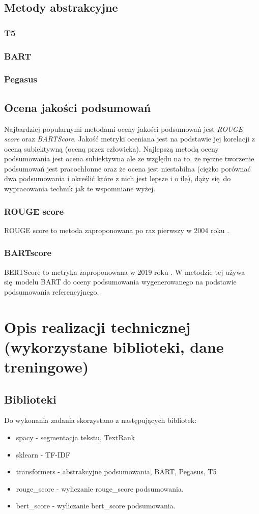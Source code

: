\documentclass{article}
\begin{document}
\subsection{Metody abstrakcyjne}

\subsubsection{T5}
\subsubsection{BART}
\subsubsection{Pegasus}

\subsection{Ocena jakości podsumowań}
Najbardziej popularnymi metodami oceny jakości podsumowań jest \textit{ROUGE score} oraz
\textit{BARTScore}. Jakość metryki oceniana jest na podstawie jej korelacji z oceną
subiektywną (oceną przez człowieka). Najlepszą metodą oceny podsumowania jest ocena subiektywna
ale ze względu na to, że ręczne tworzenie podsumowań jest pracochłonne oraz że
ocena jest niestabilna (ciężko porównać dwa podsumowania i określić które z nich jest lepsze
i o ile), dąży się do wypracowania technik jak te wspomniane wyżej.

\subsubsection{ROUGE score}
ROUGE score to metoda zaproponowana po raz pierwszy w 2004 roku \cite{lin2004rouge}.

\subsubsection{BARTscore}
BERTScore to metryka zaproponowana w 2019 roku \cite{zhang2020bertscoreevaluatingtextgeneration}. 
W metodzie tej używa się modelu BART do oceny podsumowania wygenerowanego na podstawie podsumowania
referencyjnego.

\section{Opis realizacji technicznej (wykorzystane biblioteki, dane treningowe)}
\subsection{Biblioteki}
Do wykonania zadania skorzystano z następujących bibliotek:
\begin{itemize}
	\item spacy - segmentacja tekstu, TextRank
	\item sklearn - TF-IDF
	\item transformers - abstrakcyjne podsumowania, BART, Pegasus, T5
	\item rouge\_score - wyliczanie rouge\_score podsumowania.
	\item bert\_score - wyliczanie bert\_score podsumowania.
\end{itemize}
\end{document}
